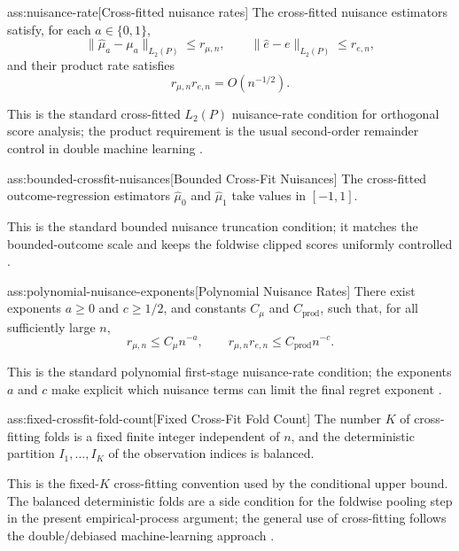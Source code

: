 \begin{assumptionv}{ass:nuisance-rate}[Cross-fitted nuisance rates]
The cross-fitted nuisance estimators satisfy, for each \(a\in\{0,1\}\),
\[
\|\widehat\mu_a-\mu_a\|_{L_2(P)}\le r_{\mu,n},
\qquad
\|\widehat e-e\|_{L_2(P)}\le r_{e,n},
\]
and their product rate satisfies
\[
r_{\mu,n}r_{e,n}=O(n^{-1/2}).
\]
\end{assumptionv}

This is the standard cross-fitted \(L_2(P)\) nuisance-rate condition for orthogonal score analysis; the product requirement is the usual second-order remainder control in double machine learning \citep{Chernozhukov2018}.

\begin{assumptionv}{ass:bounded-crossfit-nuisances}[Bounded Cross-Fit Nuisances]
The cross-fitted outcome-regression estimators \(\widehat\mu_0\) and \(\widehat\mu_1\) take values in \([-1,1]\).
\end{assumptionv}

This is the standard bounded nuisance truncation condition; it matches the bounded-outcome scale and keeps the foldwise clipped scores uniformly controlled \citep{Chernozhukov2018}.

\begin{assumptionv}{ass:polynomial-nuisance-exponents}[Polynomial Nuisance Rates]
There exist exponents \(a\ge 0\) and \(c\ge 1/2\), and constants \(C_\mu\) and \(C_{\mathrm{prod}}\), such that, for all sufficiently large \(n\),
\[
r_{\mu,n}\le C_\mu n^{-a},
\qquad
r_{\mu,n}r_{e,n}\le C_{\mathrm{prod}}n^{-c}.
\]
\end{assumptionv}

This is the standard polynomial first-stage nuisance-rate condition; the exponents \(a\) and \(c\) make explicit which nuisance terms can limit the final regret exponent \citep{Chernozhukov2018}.

\begin{assumptionv}{ass:fixed-crossfit-fold-count}[Fixed Cross-Fit Fold Count]
The number \(K\) of cross-fitting folds is a fixed finite integer independent of \(n\), and the deterministic partition \(I_1,\ldots,I_K\) of the observation indices is balanced.
\end{assumptionv}

This is the fixed-\(K\) cross-fitting convention used by the conditional upper bound.  The balanced deterministic folds are a side condition for the foldwise pooling step in the present empirical-process argument; the general use of cross-fitting follows the double/debiased machine-learning approach \citep{Chernozhukov2018}.

